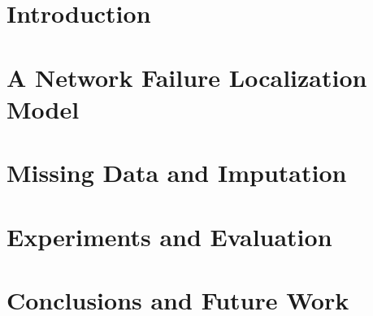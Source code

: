 \documentclass[conference]{IEEEtran}
\begin{document}


\begin{abstract}

\end{abstract}

\section{Introduction}
\label{sec:introduction}


\section{A Network Failure Localization Model}
\label{sec:fault}


\section{Missing Data and Imputation}
\label{sec:sl}


\section{Experiments and Evaluation}
\label{sec:evaluation}


\section{Conclusions and Future Work}
\label{sec:future}





%

\end{document}
